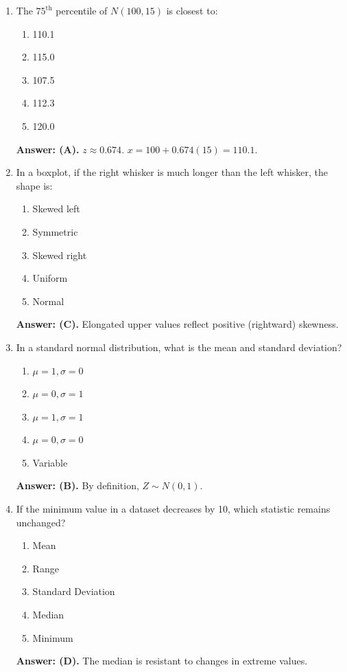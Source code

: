 \begin{enumerate}[resume, leftmargin=1.5em]
  \item The $75^{\text{th}}$ percentile of $N(100, 15)$ is closest to:
  \begin{enumerate}[label=(\Alph*)]
    \item 110.1 \item 115.0 \item 107.5 \item 112.3 \item 120.0
  \end{enumerate}
  \textbf{Answer: (A).} $z \approx 0.674$. $x = 100 + 0.674(15) = 110.1$.

  \item In a boxplot, if the right whisker is much longer than the left whisker, the shape is:
  \begin{enumerate}[label=(\Alph*)]
    \item Skewed left \item Symmetric \item Skewed right \item Uniform \item Normal
  \end{enumerate}
  \textbf{Answer: (C).} Elongated upper values reflect positive (rightward) skewness.

  \item In a standard normal distribution, what is the mean and standard deviation?
  \begin{enumerate}[label=(\Alph*)]
    \item $\mu=1, \sigma=0$ \item $\mu=0, \sigma=1$ \item $\mu=1, \sigma=1$ \item $\mu=0, \sigma=0$ \item Variable
  \end{enumerate}
  \textbf{Answer: (B).} By definition, $Z \sim N(0, 1)$.

  \item If the minimum value in a dataset decreases by 10, which statistic remains unchanged?
  \begin{enumerate}[label=(\Alph*)]
    \item Mean \item Range \item Standard Deviation \item Median \item Minimum
  \end{enumerate}
  \textbf{Answer: (D).} The median is resistant to changes in extreme values.


\end{enumerate}

